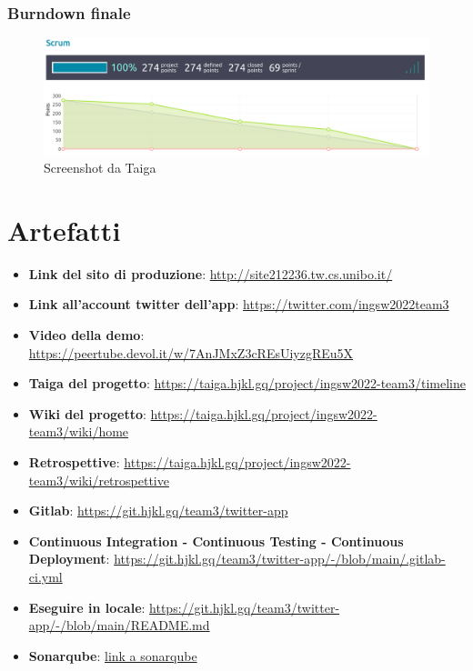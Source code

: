 \documentclass{article}
\begin{document}
\subsubsection{Burndown finale}
\begin{figure}[H]
    \centering
    \includegraphics[scale=0.22]{burdowns/burndown_finale.png}
    \caption{Screenshot da Taiga}
    \label{fig:burndown_finale}
\end{figure}
\pagebreak
\section{Artefatti}
\begin{itemize}
    \item \textbf{Link del sito di produzione}: \href{http://site212236.tw.cs.unibo.it/}{http://site212236.tw.cs.unibo.it/}
    \item \textbf{Link all'account twitter dell'app}: \href{https://twitter.com/ingsw2022team3}{https://twitter.com/ingsw2022team3}
    \item \textbf{Video della demo}: \href{https://peertube.devol.it/w/7AnJMxZ3cREsUiyzgREu5X}{https://peertube.devol.it/w/7AnJMxZ3cREsUiyzgREu5X}
    \item \textbf{Taiga del progetto}: \href{https://taiga.hjkl.gq/project/ingsw2022-team3/timeline}{https://taiga.hjkl.gq/project/ingsw2022-team3/timeline}
    \item \textbf{Wiki del progetto}: \href{https://taiga.hjkl.gq/project/ingsw2022-team3/wiki/home}{https://taiga.hjkl.gq/project/ingsw2022-team3/wiki/home}
    \item \textbf{Retrospettive}: \href{https://taiga.hjkl.gq/project/ingsw2022-team3/wiki/retrospettive}{https://taiga.hjkl.gq/project/ingsw2022-team3/wiki/retrospettive}
    \item \textbf{Gitlab}: \href{https://git.hjkl.gq/team3/twitter-app}{https://git.hjkl.gq/team3/twitter-app}
    \item \textbf{Continuous Integration - Continuous Testing - Continuous Deployment}: \href{https://git.hjkl.gq/team3/twitter-app/-/blob/main/.gitlab-ci.yml}{https://git.hjkl.gq/team3/twitter-app/-/blob/main/.gitlab-ci.yml}
    \item \textbf{Eseguire in locale}: \href{https://git.hjkl.gq/team3/twitter-app/-/blob/main/README.md}{https://git.hjkl.gq/team3/twitter-app/-/blob/main/README.md}
    \item \textbf{Sonarqube}: \href{https://qube.hjkl.gq/dashboard?id=team3_twitter-app_AYP2_cazVcJsoVycNZv6}{link a sonarqube}

\end{itemize}
\end{document}
